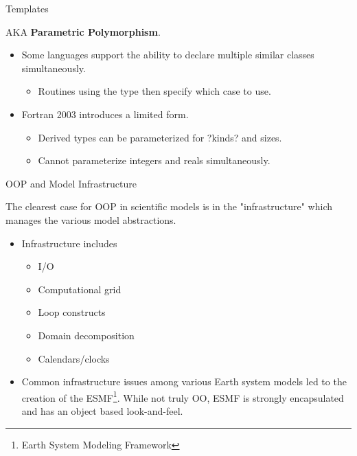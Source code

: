 \documentclass[11pt]{beamer}
\begin{document}

\begin{frame}{Templates}

AKA \textbf{Parametric Polymorphism}.
\begin{itemize}

  \item Some languages support the ability to declare multiple similar classes simultaneously.
    \begin{itemize}
    \item Routines using the type then specify which case to use.
    \end{itemize}

  \item Fortran 2003 introduces a limited form.
    \begin{itemize}
    \item Derived types can be parameterized for ?kinds? and sizes.
    \item Cannot parameterize integers and reals simultaneously.
    \end{itemize}
  
 \end{itemize}

\end{frame}


\begin{frame}{OOP and Model Infrastructure}

The clearest case for OOP in scientific models is in the "infrastructure" which manages the various model abstractions.
\begin{itemize}

  \item Infrastructure includes
    \begin{itemize}
    \item I/O
    \item Computational grid
    \item Loop constructs
    \item Domain decomposition
    \item Calendars/clocks
    \end{itemize}

  \item Common infrastructure issues among various Earth system models led to the creation of the ESMF\footnote{Earth System Modeling Framework}. While not truly OO, ESMF is strongly encapsulated and has an object based look-and-feel.
  
 \end{itemize}

\end{frame}
\end{document}
